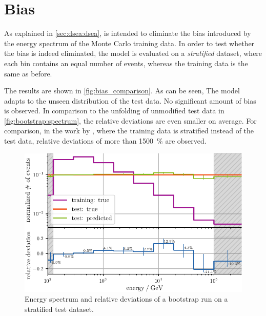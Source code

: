 \clearpage %
\section{Bias} \label{sec:unfolding:bias}
As explained in \autoref{sec:dsea:dsea},
\dsea{} is intended to eliminate the bias introduced by the energy spectrum of the Monte Carlo training data.
%
In order to test
whether the bias is indeed eliminated,
the model is evaluated on a \emph{stratified} dataset,
    where each bin contains an equal number of events,
whereas the training data is the same as before.
%

The results are shown in \autoref{fig:bias_comparison}.
As can be seen,
The model adapts to the unseen distribution of the test data.
No significant amount of bias is observed.
In comparison to the unfolding of unmodified test data in \autoref{fig:bootstrap:spectrum},
the relative deviations are even smaller on average.
%
For comparison,
in the work by \citeauthor{dsea_samuel} \cite{dsea_samuel},
  where the training data is stratified
    instead of the test data,
relative deviations of more than \SI{1500}{\percent} are observed.


\begin{figure}
  \centering
  \includegraphics[scale=1]{content/plots/bias:spectrum_full.pdf}
  \caption{
    Energy spectrum and relative deviations of a bootstrap run
    on a stratified test dataset.
  }
  \label{fig:bias_comparison}
\end{figure}
